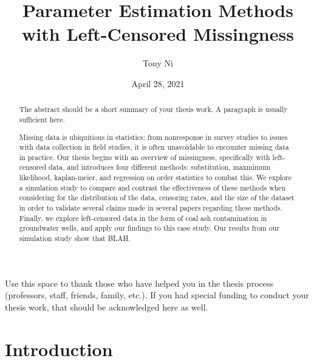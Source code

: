 \documentclass[12pt, twoside]{amherstthesis}
\title{Parameter Estimation Methods with Left-Censored Missingness}
\author{Tony Ni}
\date{April 28, 2021}
\begin{document}
\doublespace
  \maketitle

\frontmatter %
\pagestyle{fancyplain}

  \begin{abstract}
    The abstract should be a short summary of your thesis work. A paragraph is usually sufficient here.

    Missing data is ubiquitious in statistics: from nonresponse in survey studies to issues with data collection in field studies, it is
    often unavoidable to encounter missing data in practice. Our thesis begins with an overview of missingness, specifically with
    left-censored data, and introduces four different methods: substitution, maxmimum likelihood, kaplan-meier, and regression on order
    statistics to combat this. We explore a simulation study to compare and contrast the effectiveness of these methods when considering
    for the distribution of the data, censoring rates, and the size of the dataset in order to validate several claims made in several
    papers regarding these methods. Finally, we explore left-censored data in the form of coal ash contamination in groundwater wells,
    and apply our findings to this case study. Our results from our simulation study show that BLAH.
  \end{abstract}
  \begin{acknowledgments}
    Use this space to thank those who have helped you in the thesis process (professors, staff, friends, family, etc.). If you had special funding to conduct your thesis work, that should be acknowledged here as well.
  \end{acknowledgments}

  \hypersetup{linkcolor=black}
  \setcounter{tocdepth}{2}
  \tableofcontents

  \listoftables

  \listoffigures


\mainmatter %
\pagestyle{fancyplain} %

\hypertarget{intro}{%
\chapter{Introduction}\label{intro}}
\end{document}

